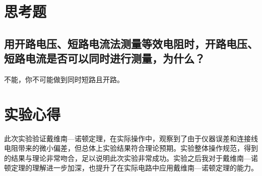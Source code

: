 \documentclass[a4paper,utf8]{article}
\begin{document}
\section{思考题}
    \subsection{用开路电压、短路电流法测量等效电阻时，开路电压、短路电流是否可以同时进行测量，为什么？}
        不能，你不可能做到同时短路且开路。
\section{实验心得}
    此次实验验证戴维南—诺顿定理，在实际操作中，观察到了由于仪器误差和连接线电阻带来的微小偏差，但总体上实验结果符合理论预期。实验整体操作规范，得到的结果与理论非常吻合，足以说明此次实验非常成功。实验之后我对于戴维南—诺顿定理的理解进一步加深，也提升了在实际电路中应用戴维南—诺顿定理的能力。
\clearpage
\end{document}
